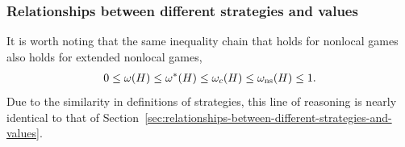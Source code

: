 \subsubsection*{Relationships between different strategies and values}

It is worth noting that the same inequality chain that holds for nonlocal games also holds for extended nonlocal games, 
\begin{align}
	0 \leq \omega(H) \leq \omega^*(H) \leq \omega_c(H) \leq \omega_{\textnormal{ns}}(H) \leq 1. 
\end{align}
Due to the similarity in definitions of strategies, this line of reasoning is nearly identical to that of Section~\ref{sec:relationships-between-different-strategies-and-values}. 

